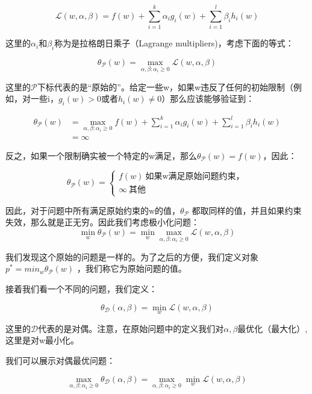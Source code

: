 \documentclass[UTF8]{ctexart}
\begin{document}
\[\mathcal{L}(w,\alpha,\beta) = f(w) + \sum_{i=1}^{k}\alpha_{i}g_{i}(w) +\sum_{i=1}^{l}\beta_{i}h_{i}(w) \]



这里的$\alpha_{i}和\beta_{i}$称为是拉格朗日乘子（Lagrange multipliers)，考虑下面的等式：

\[ \theta_{\mathcal{P}}(w) = \mathop{max}\limits_{\alpha,\beta:\alpha_{i}\geq 0} \mathcal{L}(w,\alpha,\beta) \]

这里的$\mathcal{P}$下标代表的是“原始的”。给定一些w，如果w违反了任何的初始限制（例如，对一些i，$g_{i}(w)>0$或者$h_{i}(w)\neq 0$）那么应该能够验证到：

\begin{align*}
 \theta_{\mathcal{P}}(w) & = \mathop{max}\limits_{\alpha,\beta:\alpha_{i}\geq 0} f(w) + \sum_{i=1}^{k}\alpha_{i}g_{i}(w) +\sum_{i=1}^{l}\beta_{i}h_{i}(w)\\
 & = \infty 
\end{align*}


反之，如果一个限制确实被一个特定的w满足，那么$\theta_{\mathcal{P}}(w)  = f(w)$，因此：

\begin{equation*}
    \theta_{\mathcal{P}}(w) =
    \begin{cases}
  		f(w)  \ \text{如果w满足原始问题约束}，\\
  		\infty \ 其他
    \end{cases}
\end{equation*}


因此，对于问题中所有满足原始约束的w的值，$\theta_{\mathcal{P}}$ 都取同样的值，并且如果约束失效，那么就是正无穷。因此我们考虑极小化问题：
\[
\mathop{min}\limits_{w} \theta_{\mathcal{P}}(w) = \mathop{min}\limits_{w} \mathop{max}\limits_{\alpha,\beta:\alpha_{i}\geq 0} \mathcal{L}(w,\alpha,\beta)
\]


我们发现这个原始的问题是一样的。为了之后的方便，我们定义对象$p^{*}=min_{w}\theta_{\mathcal{P}}(w)$ ，我们称它为原始问题的值。




接着我们看一个不同的问题，我们定义：

\[\theta_{\mathcal{D}}(\alpha,\beta) =\mathop{min}\limits_{w} \mathcal{L}(w,\alpha,\beta) \]

这里的$\mathcal{D}$代表的是对偶。注意，在原始问题中的定义我们对$\alpha,\beta$最优化（最大化）,这里是对w最小化。

我们可以展示对偶最优问题：

\[\mathop{max}\limits_{\alpha,\beta:\alpha_{i}\geq 0} \theta_{\mathcal{D}}(\alpha,\beta) =\mathop{max}\limits_{\alpha,\beta:\alpha_{i}\geq 0} \mathop{min}\limits_{w} \mathcal{L}(w,\alpha,\beta) \]
\end{document}
